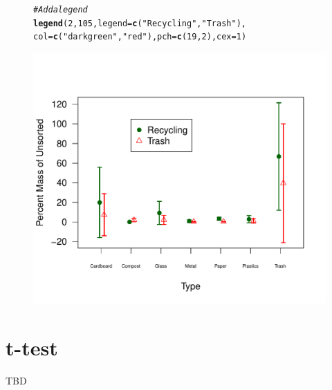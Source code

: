 \documentclass{tufte-handout}\usepackage[]{graphicx}\usepackage[]{color}
\makeatletter
\def\maxwidth{ %
  \ifdim\Gin@nat@width>\linewidth
    \linewidth
  \else
    \Gin@nat@width
  \fi
}
\newcommand{\hlnum}[1]{\textcolor[rgb]{0.686,0.059,0.569}{#1}}%
\newcommand{\hlstr}[1]{\textcolor[rgb]{0.192,0.494,0.8}{#1}}%
\newcommand{\hlcom}[1]{\textcolor[rgb]{0.678,0.584,0.686}{\textit{#1}}}%
\newcommand{\hlstd}[1]{\textcolor[rgb]{0.345,0.345,0.345}{#1}}%
\newcommand{\hlkwc}[1]{\textcolor[rgb]{0.333,0.667,0.333}{#1}}%
\newcommand{\hlkwd}[1]{\textcolor[rgb]{0.737,0.353,0.396}{\textbf{#1}}}%
\newenvironment{kframe}{%
 \def\at@end@of@kframe{}%
 \ifinner\ifhmode%
  \def\at@end@of@kframe{\end{minipage}}%
  \begin{minipage}{\columnwidth}%
 \fi\fi%
 \def\FrameCommand##1{\hskip\@totalleftmargin \hskip-\fboxsep
 \colorbox{shadecolor}{##1}\hskip-\fboxsep
     \hskip-\linewidth \hskip-\@totalleftmargin \hskip\columnwidth}%
 \MakeFramed {\advance\hsize-\width
   \@totalleftmargin\z@ \linewidth\hsize
   \@setminipage}}%
 {\par\unskip\endMakeFramed%
 \at@end@of@kframe}
\newenvironment{knitrout}{}{} %
\makeatother
\begin{document}
\begin{figure}
\begin{knitrout}
\begin{kframe}
\begin{alltt}
\hlcom{# Add a legend}
\hlkwd{legend}\hlstd{(}\hlnum{2}\hlstd{,} \hlnum{105}\hlstd{,} \hlkwc{legend}\hlstd{=}\hlkwd{c}\hlstd{(}\hlstr{"Recycling"}\hlstd{,} \hlstr{"Trash"}\hlstd{),}
       \hlkwc{col}\hlstd{=}\hlkwd{c}\hlstd{(}\hlstr{"darkgreen"}\hlstd{,} \hlstr{"red"}\hlstd{),} \hlkwc{pch}\hlstd{=}\hlkwd{c}\hlstd{(}\hlnum{19}\hlstd{,} \hlnum{2}\hlstd{),} \hlkwc{cex}\hlstd{=}\hlnum{1}\hlstd{)}
\end{alltt}
\end{kframe}
\includegraphics[width=\maxwidth]{figure/unnamed-chunk-16-1} 

\end{knitrout}
\end{figure}

\section{t-test}

TBD
\end{document}
